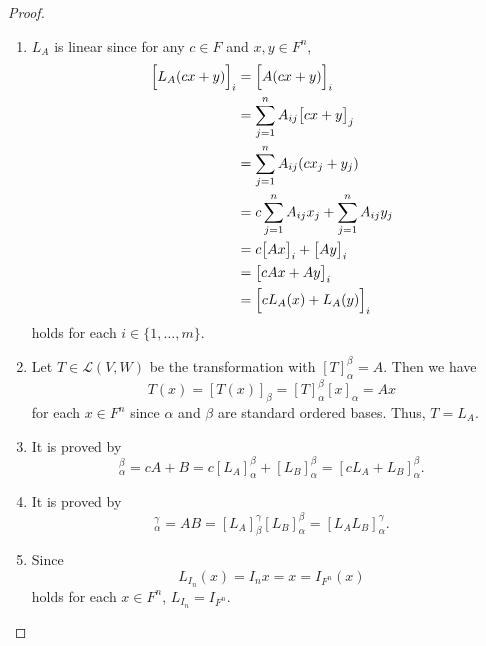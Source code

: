 \begin{proof}
  \leavevmode
  \begin{enumerate}
    \item $L_A$ is linear since for any $c \in F$ and $x, y \in F^n$,
    \begin{align*}
      \Bigl[L_A(cx + y)\Bigr]_i
      &= \Bigl[A(cx + y)\Bigr]_i \\
      &= \sum_{j=1}^n A_{ij}\bigl[cx + y\bigr]_j \\
      &= \sum_{j=1}^n A_{ij}(cx_j + y_j) \\
      &= c\sum_{j=1}^n A_{ij}x_j + \sum_{j=1}^n A_{ij}y_j \\
      &= c\bigl[Ax\bigr]_i + \bigl[Ay\bigr]_i \\
      &= \bigl[cAx + Ay\bigr]_i \\
      &= \Bigl[cL_A(x) + L_A(y)\Bigr]_i
    \end{align*}
    holds for each $i \in \{1, \dots, m\}$.
    
    \item Let $T \in \mathcal{L}(V, W)$ be the transformation with
    $[T]_\alpha^\beta = A$.
    Then we have
    \begin{equation*}
      T(x) = [T(x)]_\beta = [T]_\alpha^\beta[x]_\alpha = Ax
    \end{equation*}
    for each $x \in F^n$ since $\alpha$ and $\beta$ are standard ordered bases.
    Thus, $T = L_A$.

    \item It is proved by
    \begin{equation*}
      [L_{cA + B}]_\alpha^\beta
      = cA + B
      = c[L_A]_\alpha^\beta + [L_B]_\alpha^\beta
      = [cL_A + L_B]_\alpha^\beta.
    \end{equation*}

    \item It is proved by
    \begin{equation*}
      [L_{AB}]_\alpha^\gamma
      = AB
      = [L_A]_\beta^\gamma[L_B]_\alpha^\beta
      = [L_AL_B]_\alpha^\gamma.
    \end{equation*}
    
    \item Since
    \begin{equation*}
      L_{I_n}(x)
      = I_nx
      = x
      = I_{F^n}(x)
    \end{equation*}
    holds for each $x \in F^n$, $L_{I_n} = I_{F^n}$.
    \qedhere
  \end{enumerate}
\end{proof}

